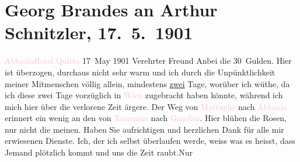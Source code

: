 

               \section[Georg Brandes an Arthur Schnitzler, 17. 5. 1901]{ Georg Brandes an Arthur Schnitzler, 17. 5. 1901}\nopagebreak{}\rehead{ }\normalsize\beginnumbering{} \toendnotes[C]{\smallbreak\pagebreak[2]} 
\pstart
           \noindent{}\centering{}{\pb}\textcolor{pink}{Abbazia}{}\ledrightnote{\textcolor{pink}{Opatija}}{\\}\textcolor{pink}{Hotel Quitta}{}\ledrightnote{\textcolor{pink}{Pension Quitta}}\pend
           \pstart
           \raggedleft{}17 May 1901\pend
           \pstart{}Verehrter Freund\pend\pstart
           Anbei die 30 Gulden. Hier ist überzogen, durchaus nicht sehr warm und ich durch
                    die Unpünktlichkeit meiner Mitmenschen völlig allein, mindestens \uline{zwei} Tage, worüber ich wüthe, da ich diese zwei Tage
                    vorzüglich in \textcolor{pink}{Wien}{}\ledrightnote{\textcolor{pink}{Wien}} zugebracht haben könnte,
                    während ich mich hier über die verlorene Zeit ärgere.\pend
           \pstart
           Der Weg von \textcolor{pink}{Mattuglie}{}\ledrightnote{\textcolor{pink}{Matulji}} nach \textcolor{pink}{Abbazia}{}\ledrightnote{\textcolor{pink}{Opatija}} erinnert ein wenig an den von \textcolor{pink}{Taormina}{}\ledrightnote{\textcolor{pink}{Taormina}} nach \textcolor{pink}{Giardini}{}\ledrightnote{\textcolor{pink}{Giardini Naxos}}.
                    Hier blühen die Rosen, nur nicht die meinen.\pend
           \pstart
           Haben Sie aufrichtigen und herzlichen Dank für alle mir erwiesenen Dienste. Ich,
                    der ich selbst überlaufen werde, weiss {\pb}was es heisst, dass Jemand
                    plötzlich kommt und uns die Zeit raubt.\hspace*{1.5em}Nur

